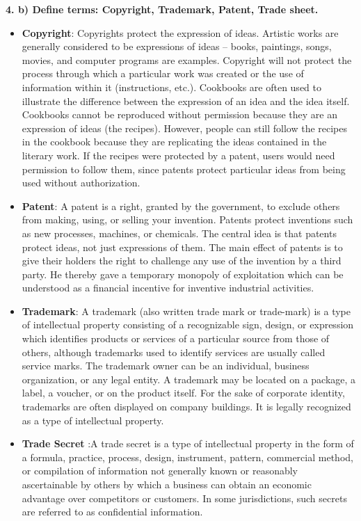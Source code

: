 \documentclass [12pt, a4paper]{article}
\begin{document}
\large
\textbf{4. b) Define terms: Copyright, Trademark, Patent, Trade sheet.}
\normalsize
\begin{itemize}
	\item \textbf{Copyright}: Copyrights protect the expression of ideas. Artistic works are generally considered to be expressions of ideas – books, paintings, songs, movies, and computer programs are examples. Copyright will not protect the process through which a particular work was created or the use of information within it (instructions, etc.). Cookbooks are often used to illustrate the difference between the expression of an idea and the idea itself. Cookbooks cannot be reproduced without permission because they are an expression of ideas (the recipes). However, people can still follow the recipes in the cookbook because they are replicating the ideas contained in the literary work. If the recipes were protected by a patent, users would need permission to follow them, since patents protect particular ideas from being used without authorization.
	\item \textbf{Patent}: A patent is a right, granted by the government, to exclude others from making, using, or selling your invention. Patents protect inventions such as new processes, machines, or chemicals. The central idea is that patents protect ideas, not just expressions of them. The main effect of patents is to give their holders the right to challenge any use of the invention by a third party. He thereby gave a temporary monopoly of exploitation which can be understood as a financial incentive for inventive industrial activities.
	\item \textbf{Trademark}: A trademark (also written trade mark or trade-mark) is a type of intellectual property consisting of a recognizable sign, design, or expression which identifies products or services of a particular source from those of others, although trademarks used to identify services are usually called service marks. The trademark owner can be an individual, business organization, or any legal entity. A trademark may be located on a package, a label, a voucher, or on the product itself. For the sake of corporate identity, trademarks are often displayed on company buildings. It is legally recognized as a type of intellectual property.
	\item \textbf{Trade Secret} :A trade secret is a type of intellectual property in the form of a formula, practice, process, design, instrument, pattern, commercial method, or compilation of information not generally known or reasonably ascertainable by others by which a business can obtain an economic advantage over competitors or customers. In some jurisdictions, such secrets are referred to as confidential information.\\
\end{itemize}
\end{document}
